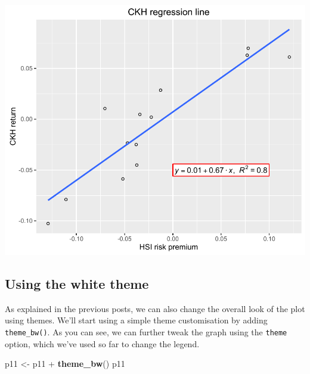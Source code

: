 \documentclass[]{article}
\newenvironment{Shaded}{\begin{snugshade}}{\end{snugshade}}
\newcommand{\KeywordTok}[1]{\textcolor[rgb]{0.13,0.29,0.53}{\textbf{{#1}}}}
\newcommand{\StringTok}[1]{\textcolor[rgb]{0.31,0.60,0.02}{{#1}}}
\newcommand{\NormalTok}[1]{{#1}}
\begin{document}
\begin{center}\includegraphics{11_Linear_Regression_Plot_pdf/lr_13-1} \end{center}

\subsection{Using the white theme}\label{using-the-white-theme}

As explained in the previous posts, we can also change the overall look
of the plot using themes. We'll start using a simple theme customisation
by adding \texttt{theme\_bw()}. As you can see, we can further tweak the
graph using the \texttt{theme} option, which we've used so far to change
the legend.

\begin{Shaded}
\begin{Highlighting}[]
\NormalTok{p11 <-}\StringTok{ }\NormalTok{p11 +}\StringTok{ }\KeywordTok{theme_bw}\NormalTok{()}
\NormalTok{p11}
\end{Highlighting}
\end{Shaded}
\end{document}

